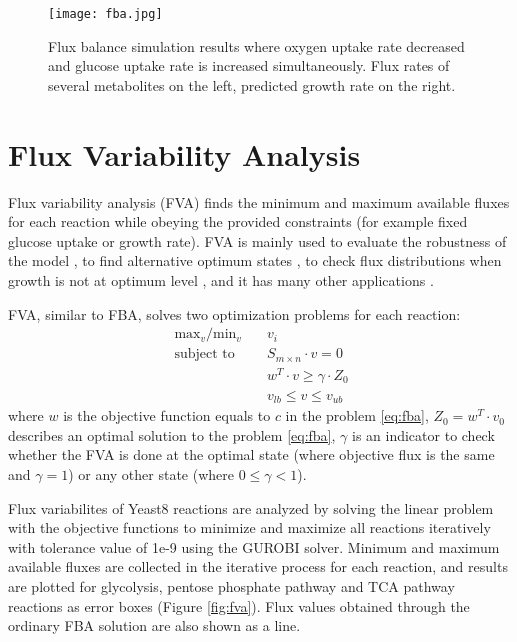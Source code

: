 \begin{figure}[H]
\begin{center}
\texttt{[image: fba.jpg]}
\end{center}
\caption[Flux balance simulation results]{Flux balance simulation results where oxygen uptake rate decreased and glucose uptake rate is increased simultaneously. Flux rates of several metabolites on the left, predicted growth rate on the right.}
\label{fig:fba}
\end{figure}


\section{Flux Variability Analysis}
Flux variability analysis (FVA) finds the minimum and maximum available fluxes for each reaction while obeying the provided constraints (for example fixed glucose uptake or growth rate). FVA is mainly used to evaluate the robustness of the model \cite{thiele2010functional}, to find alternative optimum states \cite{mahadevan2003effects}, to check flux distributions when growth is not at optimum level \cite{reed2004genome}, and it has many other applications \cite{gudmundsson2010computationally}.

FVA, similar to FBA, solves two optimization problems for each reaction:
\begin{equation}
  \begin{align}
  \ \text{max}_v / \text{min}_v \quad & v_i \\
  \ \text{subject to} \quad & S_{m \times n} \cdot v=0 \\
  \ & w^T \cdot v \geq  \gamma \cdot Z_0 \\
  \ & v_{lb} \leq v \leq v_{ub}
  \end{align}
\end{equation}
\noindent where $w$ is the objective function equals to $c$ in the problem \ref{eq:fba}, $Z_0 = w^T \cdot v_0$ describes an optimal solution to the problem \ref{eq:fba}, $\gamma$ is an indicator to check whether the FVA is done at the optimal state (where objective flux is the same and $\gamma = 1$) or any other state (where $0 \leq \gamma < 1$).

Flux variabilites of Yeast8 reactions are analyzed by solving the linear problem with the objective functions to minimize and maximize all reactions iteratively with tolerance value of 1e-9 using the GUROBI solver. Minimum and maximum available fluxes are collected in the iterative process for each reaction, and results are plotted for glycolysis, pentose phosphate pathway and TCA pathway reactions as error boxes (Figure \ref{fig:fva}). Flux values obtained through the ordinary FBA solution are also shown as a line.

